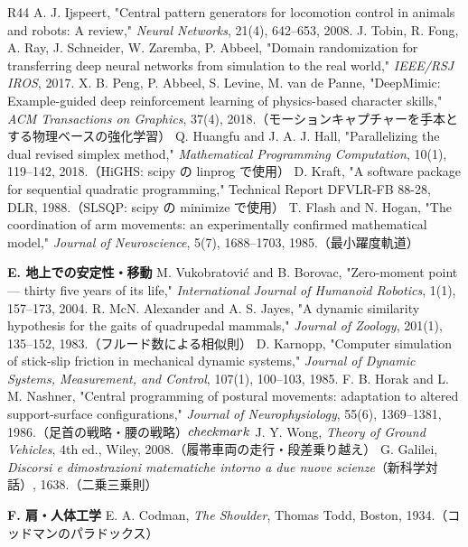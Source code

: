 \begin{thebibliography}{R44}
 A. J. Ijspeert, "Central pattern generators for locomotion control in animals and robots: A review," \textit{Neural Networks}, 21(4), 642–653, 2008.
 J. Tobin, R. Fong, A. Ray, J. Schneider, W. Zaremba, P. Abbeel, "Domain randomization for transferring deep neural networks from simulation to the real world," \textit{IEEE/RSJ IROS}, 2017.
 X. B. Peng, P. Abbeel, S. Levine, M. van de Panne, "DeepMimic: Example-guided deep reinforcement learning of physics-based character skills," \textit{ACM Transactions on Graphics}, 37(4), 2018.（モーションキャプチャーを手本とする物理ベースの強化学習）
 Q. Huangfu and J. A. J. Hall, "Parallelizing the dual revised simplex method," \textit{Mathematical Programming Computation}, 10(1), 119–142, 2018.（HiGHS: scipy の linprog で使用）
 D. Kraft, "A software package for sequential quadratic programming," Technical Report DFVLR-FB 88-28, DLR, 1988.（SLSQP: scipy の minimize で使用）
 T. Flash and N. Hogan, "The coordination of arm movements: an experimentally confirmed mathematical model," \textit{Journal of Neuroscience}, 5(7), 1688–1703, 1985.（最小躍度軌道）
\item[] \textbf{E. 地上での安定性・移動}
 M. Vukobratović and B. Borovac, "Zero-moment point — thirty five years of its life," \textit{International Journal of Humanoid Robotics}, 1(1), 157–173, 2004.
 R. McN. Alexander and A. S. Jayes, "A dynamic similarity hypothesis for the gaits of quadrupedal mammals," \textit{Journal of Zoology}, 201(1), 135–152, 1983.（フルード数による相似則）
 D. Karnopp, "Computer simulation of stick-slip friction in mechanical dynamic systems," \textit{Journal of Dynamic Systems, Measurement, and Control}, 107(1), 100–103, 1985.
 F. B. Horak and L. M. Nashner, "Central programming of postural movements: adaptation to altered support-surface configurations," \textit{Journal of Neurophysiology}, 55(6), 1369–1381, 1986.（足首の戦略・腰の戦略）$\\checkmark$
 J. Y. Wong, \textit{Theory of Ground Vehicles}, 4th ed., Wiley, 2008.（履帯車両の走行・段差乗り越え）
 G. Galilei, \textit{Discorsi e dimostrazioni matematiche intorno a due nuove scienze}（新科学対話）, 1638.（二乗三乗則）
\item[] \textbf{F. 肩・人体工学}
 E. A. Codman, \textit{The Shoulder}, Thomas Todd, Boston, 1934.（コッドマンのパラドックス）

\end{thebibliography}
